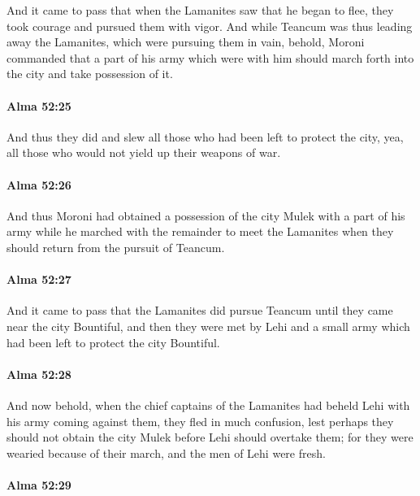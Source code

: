 			And it came to pass that when the Lamanites saw that he began to flee,
			they took courage and pursued them with vigor.
			And while Teancum was thus leading away the Lamanites,
			which were pursuing them in vain,
			behold, Moroni commanded that a part of his army which were with him
			should march forth into the city and take possession of it.

		\paragraph{Alma 52:25} %
			\label{ALMA-52-25}

			And thus they did and slew all those who had been left to protect the city,
			yea, all those who would not yield up their weapons of war.

		\paragraph{Alma 52:26} %
			\label{ALMA-52-26}

			And thus Moroni had obtained a possession of the city Mulek
			with a part of his army
			while he marched with the remainder to meet the Lamanites
			when they should return from the pursuit of Teancum.

		\paragraph{Alma 52:27} %
			\label{ALMA-52-27}

			And it came to pass that the Lamanites did pursue Teancum
			until they came near the city Bountiful,
			and then they were met by Lehi and a small army
			which had been left to protect the city Bountiful.

		\paragraph{Alma 52:28} %
			\label{ALMA-52-28}

			And now behold, when the chief captains of the Lamanites had beheld Lehi
			with his army coming against them,
			they fled in much confusion,
			lest perhaps they should not obtain the city Mulek
			before Lehi should overtake them;
			for they were wearied because of their march,
			and the men of Lehi were fresh.

		\paragraph{Alma 52:29} %
			\label{ALMA-52-29}


